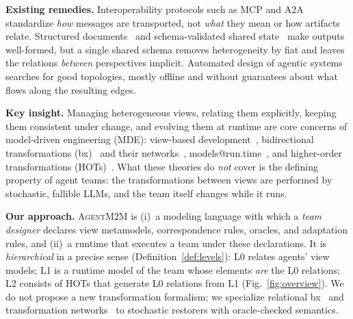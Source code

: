 \documentclass[10pt, anonymous, conference]{IEEEtran}
\theoremstyle{definition}
\theoremstyle{plain}
\theoremstyle{remark}
\newcommand{\tool}{\textsc{AgentM2M}}
\begin{document}
\smallskip\noindent\textbf{Existing remedies.} Interoperability protocols such
as MCP and A2A~\cite{mcp2024,a2a2025} standardize \emph{how} messages are
transported, not \emph{what} they mean or how artifacts relate. Structured
documents~\cite{hong2024metagpt} and schema-validated shared
state~\cite{zhang2026patchboard} make outputs well-formed, but a single shared
schema removes heterogeneity by fiat and leaves the relations \emph{between}
perspectives implicit. Automated design of agentic
systems~\cite{zhuge2024gptswarm,hu2025adas,zhang2025aflow} searches for good
topologies, mostly offline and without guarantees about what flows along the
resulting edges.

\smallskip\noindent\textbf{Key insight.} Managing heterogeneous views,
relating them explicitly, keeping them consistent under change, and evolving
them at runtime are core concerns of model-driven engineering (MDE): view-based
development~\cite{klare2021vitruvius,bruneliere2019views},
bidirectional transformations (bx)~\cite{czarnecki2009bx,stevens2010qvt}
and their networks~\cite{stevens2020networks,klare2023termination},
models@run.time~\cite{blair2009runtime}, and higher-order transformations
(HOTs)~\cite{tisi2009hot}. What these theories do \emph{not} cover is the
defining property of agent teams: the transformations between views are
performed by stochastic, fallible LLMs, and the team itself changes while it
runs.

\smallskip\noindent\textbf{Our approach.} \tool{} is (i)~a modeling language
with which a \emph{team designer} declares view metamodels, correspondence
rules, oracles, and adaptation rules, and (ii)~a runtime that executes a team
under these declarations. It is \emph{hierarchical} in a precise sense
(Definition~\ref{def:levels}): L0 relates agents' view models; L1 is a runtime
model of the team whose elements \emph{are} the L0 relations; L2 consists of
HOTs that generate L0 relations from L1 (Fig.~\ref{fig:overview}). We do not
propose a new transformation formalism; we specialize relational
bx~\cite{stevens2010qvt} and transformation networks~\cite{stevens2020networks}
to stochastic restorers with oracle-checked semantics.
\end{document}
